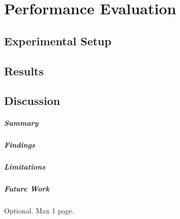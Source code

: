 \documentclass[12pt,a4paper,openright,twoside]{book}
\begin{document}
\chapter{Performance Evaluation}
\label{chap:evaluation}

\section{Experimental Setup}

\section{Results}

\section{Discussion}

\label{chap:conclusions}

\paragraph{Summary}

\paragraph{Findings}

\paragraph{Limitations}

\paragraph{Future Work}

\backmatter

\nocite{*}




\begin{acknowledgements}
Optional. Max 1 page.
\end{acknowledgements}
\end{document}
